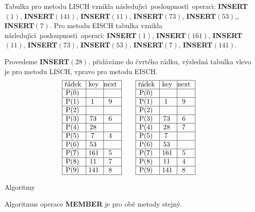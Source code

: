 \flushpar Tabulka pro metodu LISCH vznikla n\'asleduj\'\i c\'\i\ posloupnost\'\i\ 
operac\'\i :\newline 
{\bf INSERT$\left(1\right)$}, {\bf INSERT$\left(141\right)$}, {\bf INSERT$\left(11\right)$}, {\bf INSERT$
\left(73\right)$}, 
{\bf INSERT$\left(53\right)$},, {\bf INSERT$\left(7\right)$}.\newline 
Pro metodu EISCH tabulka vznikla n\'asleduj\'\i c\'\i\ posloupnost\'\i\ 
operac\'\i :\newline 
{\bf INSERT$\left(1\right)$}, {\bf INSERT$\left(161\right)$}, {\bf INSERT$\left(11\right)$}, {\bf INSERT$
\left(73\right)$}, 
{\bf INSERT$\left(53\right)$}, {\bf INSERT$\left(7\right)$}, {\bf INSERT$\left(141\right)$}. 

\flushpar Provedeme {\bf INSERT$\left(28\right)$}, p\v rid\'av\'ame do \v cvrt\'eho r\'adku, v\'y\-sled\-n\'a tabulka vlevo je pro meto\-du 
LISCH, vpravo pro metodu EISCH.
$$\vbox {\hbox{\vtop{\offinterlineskip\halign{\strut\vrule\ # & \vrule\ # & \vrule\hfil# \hfil\vrule\cr\noalign{\hrule}\v r\'adek & key & next \hfil\cr\noalign{\hrule}P(0) & &\hfill \cr\noalign{\hrule}P(1) & 1 & 9 \cr\noalign{\hrule}P(2) & &\hfill \cr\noalign{\hrule}P(3) & 73 & 6 \cr\noalign{\hrule}P(4) & 28 &\hfill \cr\noalign{\hrule}P(5) & 7 & 4 \cr\noalign{\hrule}P(6) & 53 &\hfill \cr\noalign{\hrule}P(7) & 161 & 5 \cr\noalign{\hrule}P(8) & 11 & 7 \cr\noalign{\hrule}P(9) & 141 & 8 \cr\noalign{\hrule}}}\qquad\vtop{\offinterlineskip\halign {\strut\vrule\ # & \vrule\ # & \vrule \hfil # \hfil \vrule\cr\noalign{\hrule}\v r\'adek & key & next \hfil \cr\noalign{\hrule}P(0) & &\hfill \cr\noalign{\hrule}P(1) & 1 & 9 \cr\noalign{\hrule}P(2) & &\hfill \cr\noalign{\hrule}P(3) & 73 & 6 \cr\noalign{\hrule}P(4) & 28 & 7 \cr\noalign{\hrule}P(5) & 7 & \hfill \cr\noalign{\hrule}P(6) & 53 & \hfill \cr\noalign{\hrule}P(7) & 161 & 5 \cr\noalign{\hrule}P(8) & 11 & 4  \cr\noalign{\hrule}P(9) & 141 & 8 \cr\noalign{\hrule}}}}}$$
\medskip

\subhead
Algoritmy
\endsubhead
\smallskip

\flushpar Algoritmus operace {\bf MEMBER} je pro ob\v e metody stejn\'y.
\smallskip


